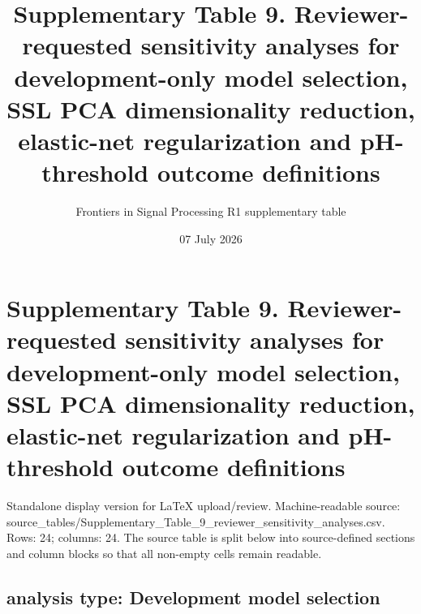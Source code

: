 \documentclass[11pt]{article}
\title{Supplementary Table 9. Reviewer-requested sensitivity analyses for development-only model selection, SSL PCA dimensionality reduction, elastic-net regularization and pH-threshold outcome definitions}
\author{Frontiers in Signal Processing R1 supplementary table}
\date{07 July 2026}
\begin{document}
\maketitle

\section*{Supplementary Table 9. Reviewer-requested sensitivity analyses for development-only model selection, SSL PCA dimensionality reduction, elastic-net regularization and pH-threshold outcome definitions}

Standalone display version for LaTeX upload/review. Machine-readable source: source\_\allowbreak{}tables/\allowbreak{}Supplementary\_\allowbreak{}Table\_\allowbreak{}9\_\allowbreak{}reviewer\_\allowbreak{}sensitivity\_\allowbreak{}analyses.\allowbreak{}csv. Rows: 24; columns: 24. The source table is split below into source-defined sections and column blocks so that all non-empty cells remain readable.

\subsection*{analysis type: Development model selection}
\end{document}

